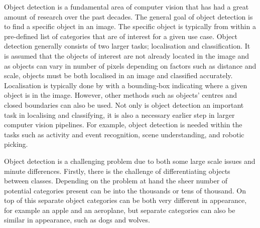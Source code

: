 \begin{comment}
	- fundamental problem in CV
		- much work over previous decades
	- goal: find specific category in a given image
		- of interest by itself. Localise and classification
		- also a pre-requisite step to higher-level vision tasks
			- activity & event recognition, scene understanding, + find more
	- difficulties 
		- inter-class differences small
		- intra-class variations large
			- shape, pose, colour, texture, background, differences in illumination/viewpoint etc between images
	- GPU/deep learning advances have meant that performance is starting to become satisfactory for real-world use in scenarios requiring high precision and accuracy
		- autonomous vehicles, military, medicinal
	- much discussion of AI taking labor jobs
		- find articles and specific examples
			- elon musk, bill gates, etc (leaders of tech)
		- object detection needed
		- improvements still to be made before being completely realised
	- next section, overview of object detection definition, key task and challenges within. Also SOTA related work
\end{comment}


Object detection is a fundamental area of computer vision that has had a great amount of research over the past decades. The general goal of object detection is to find a specific object in an image. The specific object is typically from within a pre-defined list of categories that are of interest for a given use case. Object detection generally consists of two larger tasks; localisation and classification. It is assumed that the objects of interest are not already located in the image and as objects can vary in number of pixels depending on factors such as distance and scale, objects must be both localised in an image and classified accurately. Localisation is typically done by with a bounding-box indicating where a given object is in the image. However, other methods such as objects' centres and closed boundaries can also be used. Not only is object detection an important task in localising and classifying, it is also a necessary earlier step in larger computer vision pipelines. For example, object detection is needed within the tasks such as activity and event recognition, scene understanding, and robotic picking.

Object detection is a challenging problem due to both some large scale issues and minute differences. Firstly, there is the challenge of differentiating objects between classes. Depending on the problem at hand the sheer number of potential categories present can be into the thousands or tens of thousand. On top of this separate object categories can be both very different in appearance, for example an apple and an aeroplane, but separate categories can also be similar in appearance, such as dogs and wolves.

